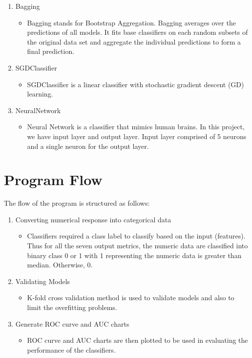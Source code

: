 \begin{enumerate}
\begin{itemize}
        \end{itemize}
    \item Bagging
        \begin{itemize}
            \item Bagging stands for Bootstrap Aggregation. Bagging averages over the predictions of all models. It fits base classifiers on each random subsets of the original data set and aggregate the individual predictions to form a final prediction.
        \end{itemize}
    \item SGDClassifier
        \begin{itemize}
            \item SGDClassifier is a linear classifier with stochastic gradient descent (GD) learning. 
        \end{itemize}
    \item NeuralNetwork
        \begin{itemize}
            \item Neural Network is a classifier that mimics human brains. In this project, we have input layer and output layer. Input layer comprised of 5 neurons and a single neuron for the output layer.
        \end{itemize}
\end{enumerate}

\section{Program Flow}

The flow of the program is structured as follows:

\begin{enumerate}
    \item Converting numerical response into categorical data
        \begin{itemize}
            \item Classifiers required a class label to classify based on the input (features). Thus for all the seven output metrics, the numeric data are classified into binary class 0 or 1 with 1 representing the numeric data is greater than median. Otherwise, 0. 
        \end{itemize}
    \item Validating Models
        \begin{itemize}
            \item K-fold cross validation method is used to validate models and also to limit the overfitting problems.
        \end{itemize}
    \item Generate ROC curve and AUC charts
        \begin{itemize}
            \item ROC curve and AUC charts are then plotted to be used in evaluating the performance of the classifiers.
        \end{itemize}
\end{enumerate}

